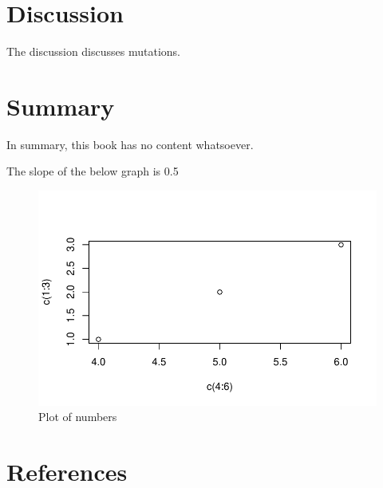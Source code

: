 \documentclass[
  12pt,
  letterpaper,
  DIV=11,
  numbers=noendperiod]{scrreprt}
\begin{document}
\hypertarget{discussion}{%
\chapter{Discussion}\label{discussion}}

The discussion discusses mutations.


\hypertarget{summary}{%
\chapter{Summary}\label{summary}}

In summary, this book has no content whatsoever.

The slope of the below graph is 0.5

\begin{figure}

{\centering \includegraphics{summary_files/figure-pdf/fig-plot-1.pdf}

}

\caption{\label{fig-plot}Plot of numbers}

\end{figure}


\hypertarget{references}{%
\chapter*{References}\label{references}}

\end{document}

